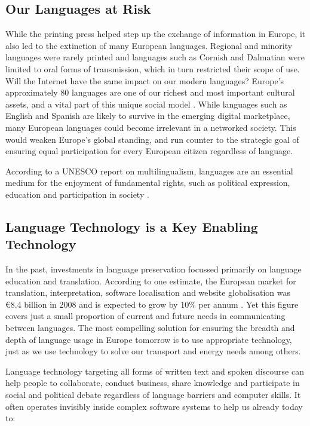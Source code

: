 \begin{multicols}{2}
\subsection{Our Languages at Risk}

While the printing press helped step up the exchange of information in Europe, it also led to the extinction of many European languages. Regional and minority languages were rarely printed and languages such as Cornish and Dalmatian were limited to oral forms of transmission, which in turn restricted their scope of use. Will the Internet have the same impact on our modern languages?
Europe’s approximately 80 languages are one of our richest and most important cultural assets, and a vital part of this unique social model \cite{EC2}. While languages such as English and Spanish are likely to survive in the emerging digital marketplace, many European languages could become irrelevant in a networked society. This would weaken Europe’s global standing, and run counter to the strategic goal of ensuring equal participation for every European citizen regardless of language.

According to a UNESCO report on multilingualism, languages are an essential medium for the enjoyment of fundamental rights, such as political expression, education and participation in society \cite{Unesco1}.



\subsection{Language Technology is a Key Enabling Technology}

In the past, investments in language preservation focussed primarily on language education and translation. According to one estimate, the European market for translation, interpretation, software localisation and website globalisation was €8.4 billion in 2008 and is expected to grow by 10\% per annum \cite{EC3}. Yet this figure covers just a small proportion of current and future needs in communicating between languages. The most compelling solution for ensuring the breadth and depth of language usage in Europe tomorrow is to use appropriate technology, just as we use technology to solve our transport and energy needs among others.

Language technology targeting all forms of written text and spoken discourse can help people to collaborate, conduct business, share knowledge and participate in social and political debate regardless of language barriers and computer skills. It often operates invisibly inside complex software systems to help us already today to:


\end{multicols}
